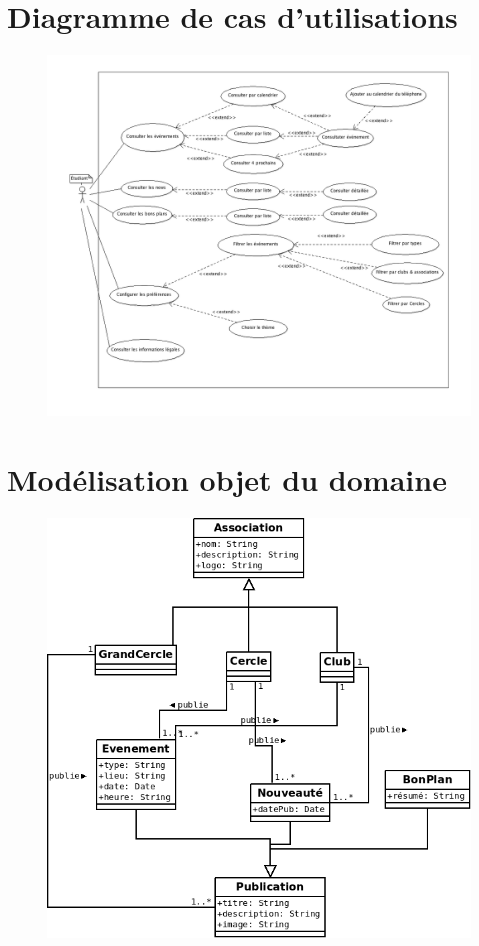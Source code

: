 \documentclass[a4paper, 11pt]{article}
\begin{document}
\section{Diagramme de cas d'utilisations}
\label{cas_util}
\begin{figure}[h!]
\includegraphics[width=19cm]{cas_utilisation.png}
\end{figure}
\newpage

\section{Modélisation objet du domaine}
\label{objet}
\begin{figure}[h]
\centering
\includegraphics[width = 13cm]{classes.png}
\end{figure}
\newpage
\end{document}
